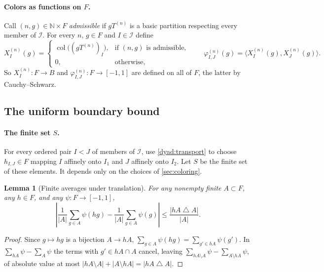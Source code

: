 \documentclass[11pt]{article}
\newcommand{\N}{\mathbb N}
\newcommand{\ip}[2]{\langle #1,#2\rangle}
\DeclareMathOperator{\colr}{col}
\newtheorem{lemma}[theorem]{Lemma}
\theoremstyle{definition}
\numberwithin{equation}{section}
\begin{document}
\paragraph{Colors as functions on \(F\).}
Call \((n,g)\in\N\times F\) \emph{admissible} if \(gT^{(n)}\) is a basic
partition respecting every member of \(\mathcal I\). For every \(n\),
\(g\in F\) and \(I\in\mathcal I\) define
\begin{equation}\label{color:global}
  X_I^{(n)}(g)=
  \begin{cases}
    \colr\bigl((gT^{(n)})_I\bigr),&\text{if $(n,g)$ is admissible},\\
    0,&\text{otherwise},
  \end{cases}
  \qquad
  \varphi_{I,J}^{(n)}(g)=\ip{X_I^{(n)}(g)}{X_J^{(n)}(g)} .
\end{equation}
So \(X_I^{(n)}:F\to B\) and \(\varphi^{(n)}_{I,J}:F\to[-1,1]\) are defined on
all of \(F\), the latter by Cauchy--Schwarz.

\subsection{The uniform boundary bound}\label{sec:boundary}

\paragraph{The finite set \(S\).}
For every ordered pair \(I<J\) of members of \(\mathcal I\), use
\cref{dyad:transport} to choose \(h_{I,J}\in F\) mapping \(I\) affinely onto
\(I_1\) and \(J\) affinely onto \(I_2\). Let \(S\) be the finite set of these
elements. It depends only on the choices of \cref{sec:coloring}.

\begin{lemma}[Finite averages under translation]\label{avg:translation}
For any nonempty finite \(A\subset F\), any \(h\in F\), and any
\(\psi:F\to[-1,1]\),
\begin{equation}\label{eq:finite-translation}
 \left|\frac1{|A|}\sum_{g\in A}\psi(hg)
       -\frac1{|A|}\sum_{g\in A}\psi(g)\right|
 \le\frac{|hA\mathbin{\triangle}A|}{|A|}.
\end{equation}
\end{lemma}

\begin{proof}
Since \(g\mapsto hg\) is a bijection \(A\to hA\),
\(\sum_{g\in A}\psi(hg)=\sum_{g'\in hA}\psi(g')\). In
\(\sum_{hA}\psi-\sum_A\psi\) the terms with \(g'\in hA\cap A\) cancel, leaving
\(\sum_{hA\setminus A}\psi-\sum_{A\setminus hA}\psi\), of absolute value at
most \(|hA\setminus A|+|A\setminus hA|=|hA\mathbin{\triangle}A|\).
\end{proof}
\end{document}
